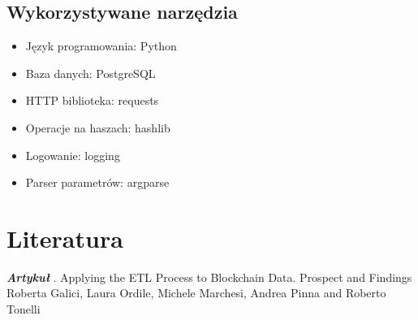 \documentclass[12pt,oneside,a4paper]{book}
\begin{document}
\newpage

\section{Wykorzystywane narzędzia}
\begin{itemize}
    \item Język programowania: Python
    \item Baza danych: PostgreSQL
    \item HTTP biblioteka: requests
    \item Operacje na haszach: hashlib
    \item Logowanie: logging
    \item Parser parametrów: argparse
\end{itemize}

\chapter{Literatura}
\textit{\textbf{Artykuł}}
. Applying the ETL Process to Blockchain Data.
Prospect and Findings
\newline
Roberta Galici, Laura Ordile, Michele Marchesi, Andrea Pinna and Roberto Tonelli
\end{document}
